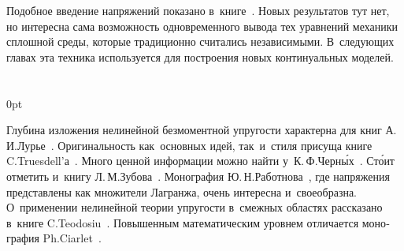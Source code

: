 \begin{otherlanguage}{russian}


Подобное введение напряжений показано в~книге~\cite{rabotnov-mechanicsofdeformable}. Новых результатов тут нет, но интересна сама возможность одновременного вывода тех уравнений механики сплошной среды, которые традиционно считались независимыми. В~следующих главах эта техника используется для построения новых континуальных моделей.

\end{otherlanguage}

\section*{\small \wordforbibliography}

\begin{changemargin}{\parindent}{0pt}
\fontsize{10}{12}\selectfont

\begin{otherlanguage}{russian}

Глубина изложения нелинейной безмоментной упругости характерна для книг А.\,И.\:Лурье~\cite{lurie-nonlinearelasticity, lurie-theoryofelasticity}. Оригинальность как~основных идей, так~и~стиля присуща книге C.\:Truesdell’а~\cite{truesdell-firstcourse}. Много ценной информации можно найти у~К.\,Ф.\:Черн\'{ы}х~\cite{chernyh-nonlinearelasticity}. Ст\'{о}ит отметить и~книгу Л.\,М.\:Зубова~\cite{zubov}. Монография Ю.\,Н.\:Работнова~\cite{rabotnov-mechanicsofdeformable}, где напряжения представлены как множители Лагранжа, очень интересна и~своеобразна. О~применении нелинейной теории упругости в~смежных областях рассказано в~книге C.\:Teodosiu~\cite{teodosiu-crystaldefects}. Повышенным математическим уровнем отличается монография Ph.\:Ciarlet~\cite{ciarlet-mathematicalelasticity}.
\par

\end{otherlanguage}

\end{changemargin}
